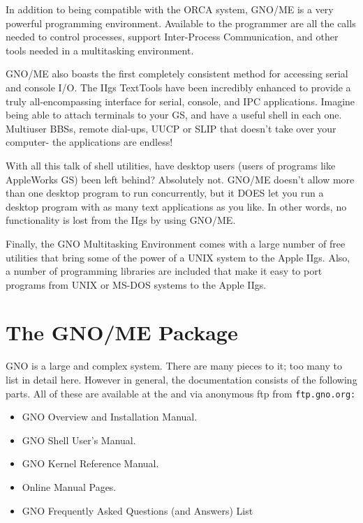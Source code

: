 \documentclass{report}
\begin{document}
In addition to being compatible with the
ORCA system, GNO/ME is a very powerful programming environment.
Available to the programmer are all the calls needed to control
processes, support Inter-Process Communication, and other tools
needed in a multitasking environment.

GNO/ME also boasts the first completely
consistent method for accessing serial and console I/O. The IIgs
TextTools have been incredibly enhanced to provide a truly
all-encompassing interface for serial, console, and IPC
applications. Imagine being able to attach terminals to your GS,
and have a useful shell in each one. Multiuser BBSs, remote
dial-ups, UUCP or SLIP that doesn't take over your computer- the
applications are endless!

With all this talk of shell utilities, have
desktop users (users of programs like AppleWorks GS) been left
behind? Absolutely not. GNO/ME doesn't allow more than one
desktop program to run concurrently, but it DOES let you run a
desktop program with as many text applications as you like. In
other words, no functionality is lost from the IIgs by using
GNO/ME.

Finally, the GNO Multitasking Environment
comes with a large number of free utilities that bring some of
the power of a UNIX system to the Apple IIgs. Also, a number of
programming libraries are included that make it easy to port
programs from UNIX or MS-DOS systems to the Apple IIgs.

\section{The GNO/ME Package}

GNO is a large and complex system.  There are many pieces to it;
too many to list in detail here.  However in general, the documentation
consists of the following parts.  All of these are available 
at the  and via anonymous ftp from
\tt ftp.gno.org\rm:

\begin{itemize}
\item	GNO Overview and Installation Manual.
\item	GNO Shell User's Manual.
\item	GNO Kernel Reference Manual.
\item	Online Manual Pages.
\item	GNO Frequently Asked Questions (and Answers) List
\end{itemize}
\end{document}
